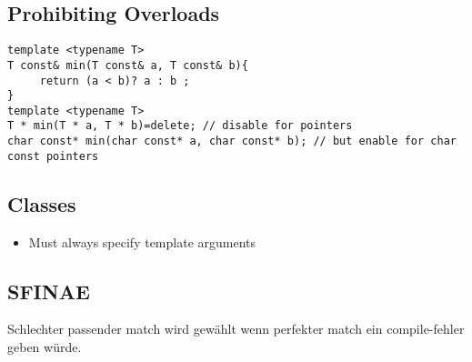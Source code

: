 \subsection{Prohibiting Overloads}
\begin{lstlisting}
template <typename T>
T const& min(T const& a, T const& b){
	 return (a < b)? a : b ;
}
template <typename T>
T * min(T * a, T * b)=delete; // disable for pointers
char const* min(char const* a, char const* b); // but enable for char const pointers
\end{lstlisting}


\subsection{Classes}
\begin{itemize}
\item Must always specify template arguments
\end{itemize}


\subsection{SFINAE}
Schlechter passender match wird gewählt wenn perfekter match ein compile-fehler geben würde.

